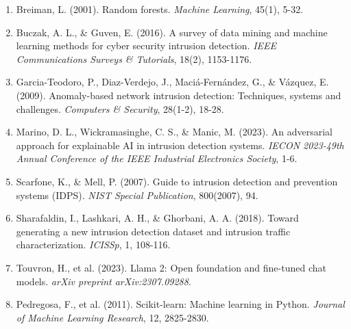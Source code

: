 \documentclass[12pt,a4paper]{article}
\begin{document}
\begin{enumerate}
    \item Breiman, L. (2001). Random forests. \textit{Machine Learning}, 45(1), 5-32.
    
    \item Buczak, A. L., \& Guven, E. (2016). A survey of data mining and machine learning methods for cyber security intrusion detection. \textit{IEEE Communications Surveys \& Tutorials}, 18(2), 1153-1176.
    
    \item Garcia-Teodoro, P., Diaz-Verdejo, J., Maciá-Fernández, G., \& Vázquez, E. (2009). Anomaly-based network intrusion detection: Techniques, systems and challenges. \textit{Computers \& Security}, 28(1-2), 18-28.
    
    \item Marino, D. L., Wickramasinghe, C. S., \& Manic, M. (2023). An adversarial approach for explainable AI in intrusion detection systems. \textit{IECON 2023-49th Annual Conference of the IEEE Industrial Electronics Society}, 1-6.
    
    \item Scarfone, K., \& Mell, P. (2007). Guide to intrusion detection and prevention systems (IDPS). \textit{NIST Special Publication}, 800(2007), 94.
    
    \item Sharafaldin, I., Lashkari, A. H., \& Ghorbani, A. A. (2018). Toward generating a new intrusion detection dataset and intrusion traffic characterization. \textit{ICISSp}, 1, 108-116.
    
    \item Touvron, H., et al. (2023). Llama 2: Open foundation and fine-tuned chat models. \textit{arXiv preprint arXiv:2307.09288}.
    
    \item Pedregosa, F., et al. (2011). Scikit-learn: Machine learning in Python. \textit{Journal of Machine Learning Research}, 12, 2825-2830.
\end{enumerate}
\end{document}
